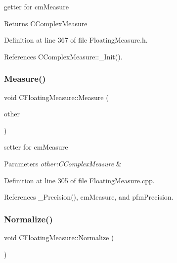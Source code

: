getter for cm\+Measure 

\begin{DoxyReturn}{Returns}
\hyperlink{classCComplexMeasure}{C\+Complex\+Measure} 
\end{DoxyReturn}


Definition at line 367 of file Floating\+Measure.\+h.



References C\+Complex\+Measure\+::\+\_\+\+Init().

\mbox{\label{classCFloatingMeasure_af35c54ac06b1c8ddca86390360559548}} 
\subsubsection{\texorpdfstring{Measure()}{Measure()}\hspace{0.1cm}{\footnotesize\ttfamily [2/2]}}
{\footnotesize\ttfamily void C\+Floating\+Measure\+::\+Measure (\begin{DoxyParamCaption}\item[{const \hyperlink{classCComplexMeasure}{C\+Complex\+Measure} \&}]{other }\end{DoxyParamCaption})\hspace{0.3cm}{\ttfamily [protected]}}



setter for cm\+Measure 


\begin{DoxyParams}{Parameters}
{\em other\+:\+C\+Complex\+Measure} & \\
\hline
\end{DoxyParams}


Definition at line 305 of file Floating\+Measure.\+cpp.



References \+\_\+\+Precision(), cm\+Measure, and pfm\+Precision.

\mbox{\label{classCFloatingMeasure_af4e2cc6a78b8e0cda11df432902bde8a}} 
\subsubsection{\texorpdfstring{Normalize()}{Normalize()}}
{\footnotesize\ttfamily void C\+Floating\+Measure\+::\+Normalize (\begin{DoxyParamCaption}{ }\end{DoxyParamCaption})}



